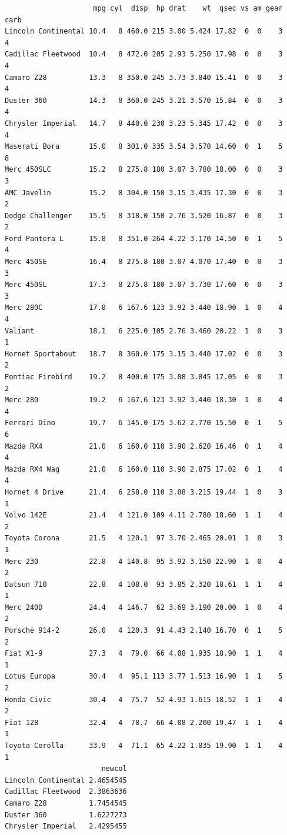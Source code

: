 \documentclass[
]{article}
\begin{document}
\begin{verbatim}
                     mpg cyl  disp  hp drat    wt  qsec vs am gear carb
Lincoln Continental 10.4   8 460.0 215 3.00 5.424 17.82  0  0    3    4
Cadillac Fleetwood  10.4   8 472.0 205 2.93 5.250 17.98  0  0    3    4
Camaro Z28          13.3   8 350.0 245 3.73 3.840 15.41  0  0    3    4
Duster 360          14.3   8 360.0 245 3.21 3.570 15.84  0  0    3    4
Chrysler Imperial   14.7   8 440.0 230 3.23 5.345 17.42  0  0    3    4
Maserati Bora       15.0   8 301.0 335 3.54 3.570 14.60  0  1    5    8
Merc 450SLC         15.2   8 275.8 180 3.07 3.780 18.00  0  0    3    3
AMC Javelin         15.2   8 304.0 150 3.15 3.435 17.30  0  0    3    2
Dodge Challenger    15.5   8 318.0 150 2.76 3.520 16.87  0  0    3    2
Ford Pantera L      15.8   8 351.0 264 4.22 3.170 14.50  0  1    5    4
Merc 450SE          16.4   8 275.8 180 3.07 4.070 17.40  0  0    3    3
Merc 450SL          17.3   8 275.8 180 3.07 3.730 17.60  0  0    3    3
Merc 280C           17.8   6 167.6 123 3.92 3.440 18.90  1  0    4    4
Valiant             18.1   6 225.0 105 2.76 3.460 20.22  1  0    3    1
Hornet Sportabout   18.7   8 360.0 175 3.15 3.440 17.02  0  0    3    2
Pontiac Firebird    19.2   8 400.0 175 3.08 3.845 17.05  0  0    3    2
Merc 280            19.2   6 167.6 123 3.92 3.440 18.30  1  0    4    4
Ferrari Dino        19.7   6 145.0 175 3.62 2.770 15.50  0  1    5    6
Mazda RX4           21.0   6 160.0 110 3.90 2.620 16.46  0  1    4    4
Mazda RX4 Wag       21.0   6 160.0 110 3.90 2.875 17.02  0  1    4    4
Hornet 4 Drive      21.4   6 258.0 110 3.08 3.215 19.44  1  0    3    1
Volvo 142E          21.4   4 121.0 109 4.11 2.780 18.60  1  1    4    2
Toyota Corona       21.5   4 120.1  97 3.70 2.465 20.01  1  0    3    1
Merc 230            22.8   4 140.8  95 3.92 3.150 22.90  1  0    4    2
Datsun 710          22.8   4 108.0  93 3.85 2.320 18.61  1  1    4    1
Merc 240D           24.4   4 146.7  62 3.69 3.190 20.00  1  0    4    2
Porsche 914-2       26.0   4 120.3  91 4.43 2.140 16.70  0  1    5    2
Fiat X1-9           27.3   4  79.0  66 4.08 1.935 18.90  1  1    4    1
Lotus Europa        30.4   4  95.1 113 3.77 1.513 16.90  1  1    5    2
Honda Civic         30.4   4  75.7  52 4.93 1.615 18.52  1  1    4    2
Fiat 128            32.4   4  78.7  66 4.08 2.200 19.47  1  1    4    1
Toyota Corolla      33.9   4  71.1  65 4.22 1.835 19.90  1  1    4    1
                       newcol
Lincoln Continental 2.4654545
Cadillac Fleetwood  2.3863636
Camaro Z28          1.7454545
Duster 360          1.6227273
Chrysler Imperial   2.4295455

\end{verbatim}
\end{document}
